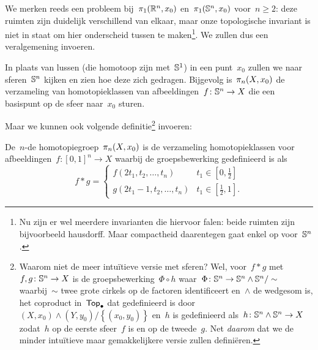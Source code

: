 \documentclass[a4paper,11pt,openany,oneside,article]{memoir}
\begin{document}
We merken reeds een probleem bij~$\pi_1(\mathbb{R}^n,x_0)$ en~$\pi_1(\mathbb{S}^n,x_0)$ voor~$n\geq 2$: deze ruimten zijn duidelijk verschillend van elkaar, maar onze topologische invariant is niet in staat om hier onderscheid tussen te maken\footnote{Nu zijn er wel meerdere invarianten die hiervoor falen: beide ruimten zijn bijvoorbeeld hausdorff. Maar compactheid daarentegen gaat enkel op voor~$\mathbb{S}^n$.}. We zullen dus een veralgemening invoeren.

In plaats van lussen (die homotoop zijn met~$\mathbb{S}^1$) in een punt~$x_0$ zullen we naar sferen~$\mathbb{S}^n$ kijken en zien hoe deze zich gedragen. Bijgevolg is~$\pi_n(X,x_0)$ de verzameling van homotopieklassen van afbeeldingen~$f\colon\mathbb{S}^n\to X$ die een basispunt op de sfeer naar~$x_0$ sturen.

Maar we kunnen ook volgende definitie\footnote{Waarom niet de meer intu\"itieve versie met sferen? Wel, voor~$f\ast g$ met~$f,g\colon\mathbb{S}^n\to X$ is de groepsbewerking~$\Phi\circ h$ waar~$\Phi\colon\mathbb{S}^n\to\mathbb{S}^n\wedge\mathbb{S}^n/\sim$ waarbij~$\sim$ twee grote cirkels op de factoren identificeert en~$\wedge$ de wedgesom is, het coproduct in~$\mathsf{Top}_{\bullet}$ dat gedefinieerd is door~$(X,x_0)\wedge(Y,y_0)/\left\{ (x_0,y_0) \right\}
$ en~$h$ is gedefinieerd als~$h\colon\mathbb{S}^n\wedge\mathbb{S}^n\to X$ zodat~$h$ op de eerste sfeer~$f$ is en op de tweede~$g$. Net \emph{daarom} dat we de minder intu\"itieve maar gemakkelijkere versie zullen defini\"eren.} invoeren:

\begin{definition}
  De~$n$\nobreakdash-de homotopiegroep~$\pi_n(X,x_0)$ is de verzameling homotopieklassen voor afbeeldingen~$f\colon[0,1]^n\to X$ waarbij de groepsbewerking gedefinieerd is als
  \begin{equation}
    f\ast g=
    \begin{cases}
      f(2t_1,t_2,\ldots,t_n) & t_1\in\left[ 0,\frac{1}{2} \right] \\
      g(2t_1-1,t_2,\ldots,t_n) & t_1\in\left[ \frac{1}{2},1 \right].
    \end{cases}
  \end{equation}
\end{definition}
\end{document}
